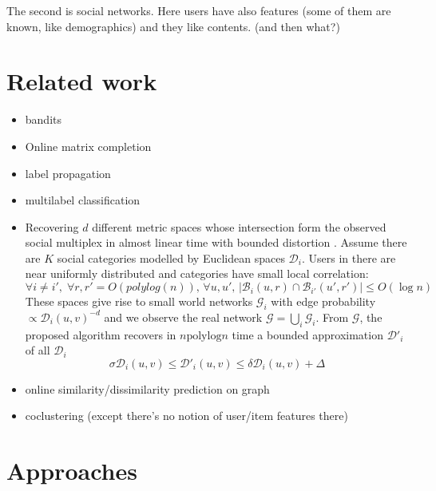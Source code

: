 The second is social networks. Here users have also features (some of them are
known, like demographics) and they like contents. \comment(and then what?)

\section{Related work}

\begin{itemize}
	\item bandits \autocites{ClusterBandit14}{Li2015}
	\item Online matrix completion \autocite{OnlineMatrix15}
	\item label propagation \autocite{LabelPropa03}
	\item multilabel classification \autocite{Madjarov2012}
	\item Recovering $d$ different metric spaces whose intersection form the
		observed social multiplex in almost linear time with bounded distortion
		\autocite{Abraham2012a}. Assume there are $K$ social categories
		modelled by Euclidean spaces $\mathcal{D}_i$. Users in there are near
		uniformly distributed and categories have small local correlation: \[
			\forall i\neq i', \; \forall r, r' = O(polylog(n)),\, \forall u,
			u',\, |\mathcal{B}_i(u, r) \cap \mathcal{B}_{i'}(u', r')| \leq O(\log n) \]
		These spaces give rise to small world networks $\mathcal{G}_i$ with
		edge probability $\propto \mathcal{D}_i(u, v)^{-d}$ and we observe the
		real network $\mathcal{G} =\bigcup_i \mathcal{G}_i$. From
		$\mathcal{G}$, the proposed algorithm recovers in $n \mathrm{polylog} n$ time
		a bounded approximation $\mathcal{D}'_i$ of all $\mathcal{D}_i$ \[
			\sigma \mathcal{D}_i(u, v) \leq \mathcal{D}'_i(u, v) \leq \delta
			\mathcal{D}_i(u, v) + \Delta \]
	\item online similarity/dissimilarity prediction on graph \autocite{Gentile2013}
	\item coclustering \autocite{Dhillon2001} (except there's no notion of
		user/item features there)
\end{itemize}

\section{Approaches}

